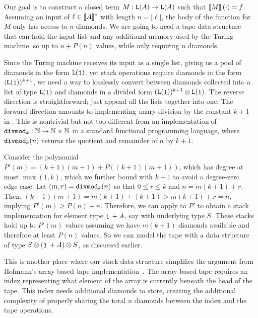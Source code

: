 Our goal is to construct a closed term $M : \tplist{A} \to \tplist{A}$ such that ${\llbracket M \rrbracket}\left(\cdot\right) = f$. Assuming an input of $\ell \in \llbracket A \rrbracket^*$ with length $n = |\ell|$, the body of the function for $M$ only has access to $n$ diamonds. We are going to need a tape data structure that can hold the input list and any additional memory used by the Turing machine, so up to $n + P(n)$ values, while only requiring $n$ diamonds. %

Since the Turing machine receives its input as a single list, giving us a pool of diamonds in the form $\tplist{\tpunit}$, yet stack operations require diamonds in the form $(\tplist{\tpunit})^{k + 1}$, we need a way to losslessly convert between diamonds collected into a list of type $\tplist{\tpunit}$ and diamonds in a divided form $\tptens{(\tplist{\tpunit})^{k + 1}}{\tplist{\tpunit}}$. The reverse direction is straightforward; just append all the lists together into one. The forward direction amounts to implementing unary division by the constant $k + 1$ in \lfpl.
%
This is nontrivial but not too different from an implementation of $\mathtt{divmod}_k : \mathbb N \to \mathbb N \times \mathbb N$ in a standard functional programming language, where $\mathtt{divmod}_k(n)$ returns the quotient and remainder of $n$ by $k + 1$.

Consider the polynomial $P'(m) = (k + 1)(m + 1) + P((k + 1)(m + 1))$, which has degree at most $\max(1, k)$, which we further bound with $k + 1$ to avoid a degree-zero edge case. Let $(m, r) = \mathtt{divmod}_k(n)$ so that $0 \le r \le k$ and $n = m(k + 1) + r$. Then, $(k + 1)(m + 1) = m(k + 1) + (k + 1) > m(k + 1) + r = n$, implying $P'(m) \ge P(n) + n$. Therefore, we can apply  to $P'$ to obtain a stack implementation for element type $\tpsum{\tpunit{}}{A}$, say with underlying type $S$. These stacks hold up to $P'(m)$ values assuming we have $m(k + 1)$ diamonds available  and therefore at least $P(n)$ values. So we can model the tape with a data structure of type $\tptens{S}{\tptens{(\tpsum{\tpunit{}}{A})}{S}}$, as discussed earlier.

This is another place where our stack data structure simplifies the argument from Hofmann's array-based tape implementation~\cite{hofmannStrengthNonsizeIncreasing2002}. The array-based tape requires an index representing what element of the array is currently beneath the head of the tape. This index needs additional diamonds to store, creating the additional complexity of properly sharing the total $n$ diamonds between the index and the tape operations.

